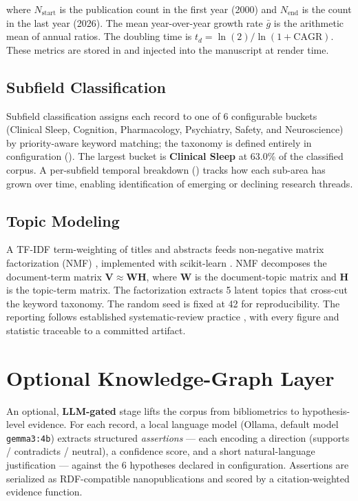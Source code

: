 \documentclass[
  english,
]{article}
\begin{document}
where \(N_{\text{start}}\) is the publication count in the first year
(2000) and \(N_{\text{end}}\) is the count in the last year (2026). The
mean year-over-year growth rate \(\bar{g}\) is the arithmetic mean of
annual ratios. The doubling time is
\(t_d = \ln(2) / \ln(1 + \text{CAGR})\). These metrics are stored in
 and injected into the manuscript at
render time.

\subsection{Subfield Classification}\label{subfield-classification}

Subfield classification assigns each record to one of 6 configurable
buckets (Clinical Sleep, Cognition, Pharmacology, Psychiatry, Safety,
and Neuroscience) by priority-aware keyword matching; the taxonomy is
defined entirely in configuration
(). The largest bucket is
\textbf{Clinical Sleep} at 63.0\% of the classified corpus. A
per-subfield temporal breakdown ()
tracks how each sub-area has grown over time, enabling identification of
emerging or declining research threads.

\subsection{Topic Modeling}\label{topic-modeling}

A TF-IDF term-weighting of titles and abstracts \citep{salton1988term}
feeds non-negative matrix factorization (NMF) \citep{lee1999learning},
implemented with scikit-learn \citep{pedregosa2011scikit}. NMF
decomposes the document-term matrix
\(\mathbf{V} \approx \mathbf{W} \mathbf{H}\), where \(\mathbf{W}\) is
the document-topic matrix and \(\mathbf{H}\) is the topic-term matrix.
The factorization extracts 5 latent topics that cross-cut the keyword
taxonomy. The random seed is fixed at 42 for reproducibility. The
reporting follows established systematic-review practice
\citep{page2021prisma}, with every figure and statistic traceable to a
committed artifact.

\newpage

\section{Optional Knowledge-Graph
Layer}\label{optional-knowledge-graph-layer}

An optional, \textbf{LLM-gated} stage lifts the corpus from
bibliometrics to hypothesis-level evidence. For each record, a local
language model (Ollama, default model \texttt{gemma3:4b}) extracts
structured \emph{assertions} --- each encoding a direction (supports /
contradicts / neutral), a confidence score, and a short natural-language
justification --- against the 6 hypotheses declared in configuration.
Assertions are serialized as RDF-compatible nanopublications
\citep{kuhn2016decentralized} and scored by a citation-weighted evidence
function.
\end{document}
